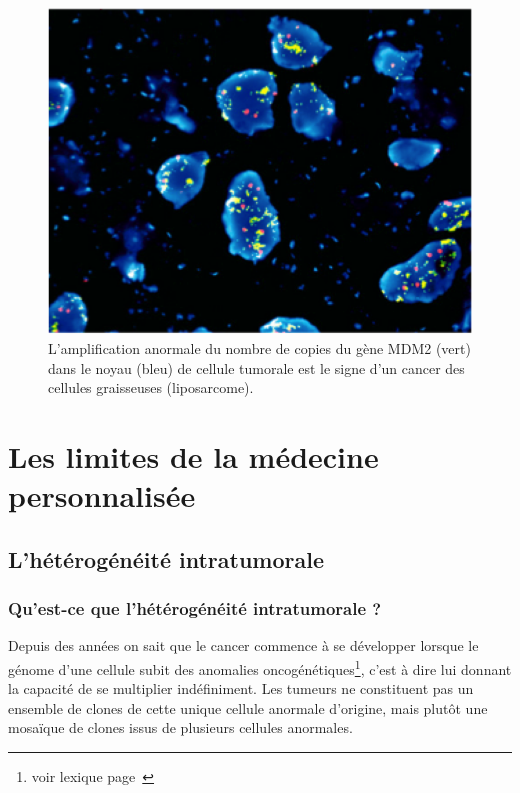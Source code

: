 \documentclass[12pt, openany]{report}
\begin{document}
\begin{figure}[H]
\begin{center}
    \includegraphics[scale=1]{Images/im12.png}
\caption{L'amplification anormale du nombre de copies du gène MDM2 (vert) dans le noyau (bleu) de cellule tumorale est le signe d'un cancer des cellules graisseuses (liposarcome).}
\end{center}
\end{figure}

\chapter{Les limites de la médecine personnalisée}

\section{L'hétérogénéité intratumorale}

\subsection{Qu’est-ce que l’hétérogénéité intratumorale ?}

Depuis des années on sait que le cancer commence à se développer lorsque le génome d’une cellule subit des anomalies oncogénétiques\footnote{voir lexique page~\pageref{lexique}}, c’est à dire lui donnant la capacité de se multiplier indéfiniment. Les tumeurs ne constituent pas un ensemble de clones de cette unique cellule anormale d’origine, mais plutôt une mosaïque de clones issus de plusieurs cellules anormales. 
\end{document}
